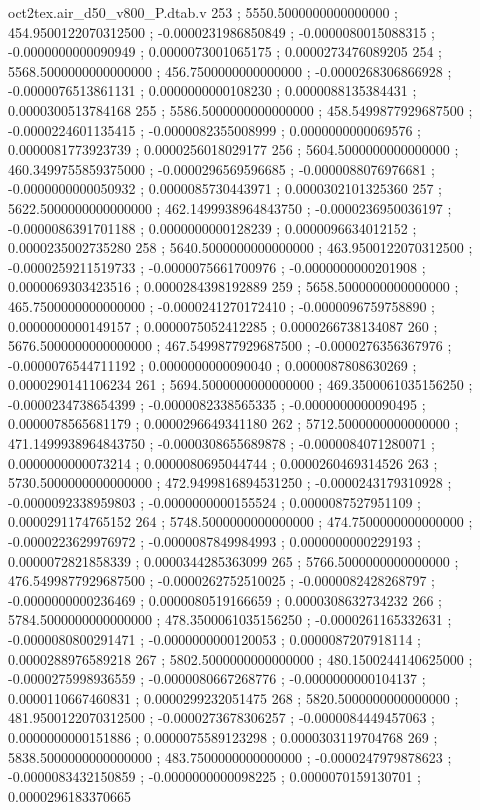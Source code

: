 \begin{filecontents}[overwrite]{oct2tex.air_d50_v800_P.dtab.v}
253 ; 5550.5000000000000000 ; 454.9500122070312500 ; -0.0000231986850849 ; -0.0000080015088315 ; -0.0000000000090949 ; 0.0000073001065175 ; 0.0000273476089205
254 ; 5568.5000000000000000 ; 456.7500000000000000 ; -0.0000268306866928 ; -0.0000076513861131 ; 0.0000000000108230 ; 0.0000088135384431 ; 0.0000300513784168
255 ; 5586.5000000000000000 ; 458.5499877929687500 ; -0.0000224601135415 ; -0.0000082355008999 ; 0.0000000000069576 ; 0.0000081773923739 ; 0.0000256018029177
256 ; 5604.5000000000000000 ; 460.3499755859375000 ; -0.0000296569596685 ; -0.0000088076976681 ; -0.0000000000050932 ; 0.0000085730443971 ; 0.0000302101325360
257 ; 5622.5000000000000000 ; 462.1499938964843750 ; -0.0000236950036197 ; -0.0000086391701188 ; 0.0000000000128239 ; 0.0000096634012152 ; 0.0000235002735280
258 ; 5640.5000000000000000 ; 463.9500122070312500 ; -0.0000259211519733 ; -0.0000075661700976 ; -0.0000000000201908 ; 0.0000069303423516 ; 0.0000284398192889
259 ; 5658.5000000000000000 ; 465.7500000000000000 ; -0.0000241270172410 ; -0.0000096759758890 ; 0.0000000000149157 ; 0.0000075052412285 ; 0.0000266738134087
260 ; 5676.5000000000000000 ; 467.5499877929687500 ; -0.0000276356367976 ; -0.0000076544711192 ; 0.0000000000090040 ; 0.0000087808630269 ; 0.0000290141106234
261 ; 5694.5000000000000000 ; 469.3500061035156250 ; -0.0000234738654399 ; -0.0000082338565335 ; -0.0000000000090495 ; 0.0000078565681179 ; 0.0000296649341180
262 ; 5712.5000000000000000 ; 471.1499938964843750 ; -0.0000308655689878 ; -0.0000084071280071 ; 0.0000000000073214 ; 0.0000080695044744 ; 0.0000260469314526
263 ; 5730.5000000000000000 ; 472.9499816894531250 ; -0.0000243179310928 ; -0.0000092338959803 ; -0.0000000000155524 ; 0.0000087527951109 ; 0.0000291174765152
264 ; 5748.5000000000000000 ; 474.7500000000000000 ; -0.0000223629976972 ; -0.0000087849984993 ; 0.0000000000229193 ; 0.0000072821858339 ; 0.0000344285363099
265 ; 5766.5000000000000000 ; 476.5499877929687500 ; -0.0000262752510025 ; -0.0000082428268797 ; -0.0000000000236469 ; 0.0000080519166659 ; 0.0000308632734232
266 ; 5784.5000000000000000 ; 478.3500061035156250 ; -0.0000261165332631 ; -0.0000080800291471 ; -0.0000000000120053 ; 0.0000087207918114 ; 0.0000288976589218
267 ; 5802.5000000000000000 ; 480.1500244140625000 ; -0.0000275998936559 ; -0.0000080667268776 ; -0.0000000000104137 ; 0.0000110667460831 ; 0.0000299232051475
268 ; 5820.5000000000000000 ; 481.9500122070312500 ; -0.0000273678306257 ; -0.0000084449457063 ; 0.0000000000151886 ; 0.0000075589123298 ; 0.0000303119704768
269 ; 5838.5000000000000000 ; 483.7500000000000000 ; -0.0000247979878623 ; -0.0000083432150859 ; -0.0000000000098225 ; 0.0000070159130701 ; 0.0000296183370665

\end{filecontents}
